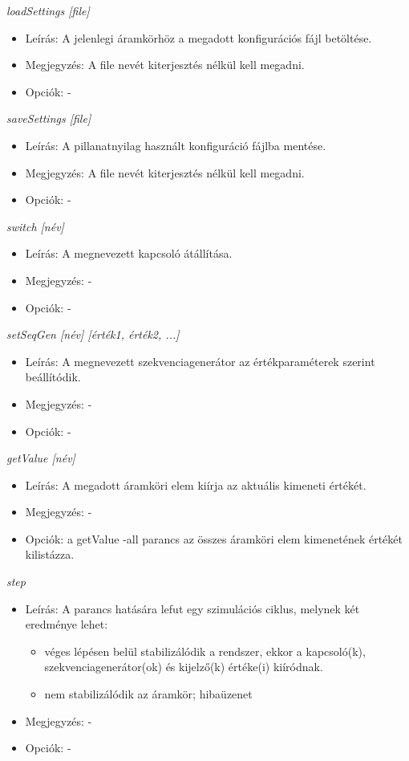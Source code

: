 \textit{loadSettings [file]}
\begin{itemize}
	\item Leírás: A jelenlegi áramkörhöz a megadott konfigurációs fájl betöltése.
	\item Megjegyzés: A file nevét kiterjesztés nélkül kell megadni.
	\item Opciók: -
\end{itemize}

\textit{saveSettings [file]}
\begin{itemize}
	\item Leírás: A pillanatnyilag használt konfiguráció fájlba mentése.
	\item Megjegyzés: A file nevét kiterjesztés nélkül kell megadni.
	\item Opciók: -
\end{itemize}

\textit{switch [név]}
\begin{itemize}
	\item Leírás: A megnevezett kapcsoló átállítása.
	\item Megjegyzés: -
	\item Opciók: -
\end{itemize}

\textit{setSeqGen [név] [érték1, érték2, ...]}
\begin{itemize}
	\item Leírás: A megnevezett szekvenciagenerátor az értékparaméterek szerint beállítódik.
	\item Megjegyzés: -
	\item Opciók: -
\end{itemize}

\textit{getValue [név]}
\begin{itemize}
	\item Leírás: A megadott áramköri elem kiírja az aktuális kimeneti értékét.
	\item Megjegyzés: -
	\item Opciók: a getValue -all parancs az összes áramköri elem kimenetének értékét kilistázza.
\end{itemize}

\textit{step}
\begin{itemize}
	\item Leírás: A parancs hatására lefut egy szimulációs ciklus, melynek két eredménye lehet:
	\begin{itemize}
		\item véges lépésen belül stabilizálódik a rendszer, ekkor a kapcsoló(k), szekvenciagenerátor(ok) és kijelző(k) értéke(i) kiíródnak.
		\item nem stabilizálódik az áramkör; hibaüzenet
	\end{itemize}
	\item Megjegyzés: - 
	\item Opciók: -
\end{itemize}

